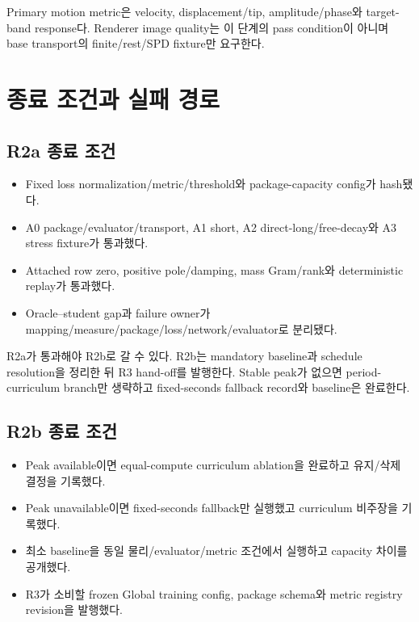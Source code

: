 \documentclass[10pt]{article}
\begin{document}
Primary motion metric은 velocity, displacement/tip, amplitude/phase와 target-band response다.
Renderer image quality는 이 단계의 pass condition이 아니며 base transport의 finite/rest/SPD fixture만 요구한다.

\section{종료 조건과 실패 경로}
\label{sec:r2-chapter-8}

\subsection{R2a 종료 조건}

\begin{itemize}
  \item[$\square$] Fixed loss normalization/metric/threshold와 package-capacity config가 hash됐다.
  \item[$\square$] A0 package/evaluator/transport, A1 short, A2 direct-long/free-decay와 A3 stress fixture가 통과했다.
  \item[$\square$] Attached row zero, positive pole/damping, mass Gram/rank와 deterministic replay가 통과했다.
  \item[$\square$] Oracle--student gap과 failure owner가 mapping/measure/package/loss/network/evaluator로 분리됐다.
\end{itemize}

R2a가 통과해야 R2b로 갈 수 있다. R2b는 mandatory baseline과 schedule resolution을 정리한 뒤
R3 hand-off를 발행한다. Stable peak가 없으면 period-curriculum branch만 생략하고 fixed-seconds
fallback record와 baseline은 완료한다.

\subsection{R2b 종료 조건}

\begin{itemize}
  \item[$\square$] Peak available이면 equal-compute curriculum ablation을 완료하고 유지/삭제 결정을 기록했다.
  \item[$\square$] Peak unavailable이면 fixed-seconds fallback만 실행했고 curriculum 비주장을 기록했다.
  \item[$\square$] 최소 baseline을 동일 물리/evaluator/metric 조건에서 실행하고 capacity 차이를 공개했다.
  \item[$\square$] R3가 소비할 frozen Global training config, package schema와 metric registry revision을 발행했다.
\end{itemize}
\end{document}
